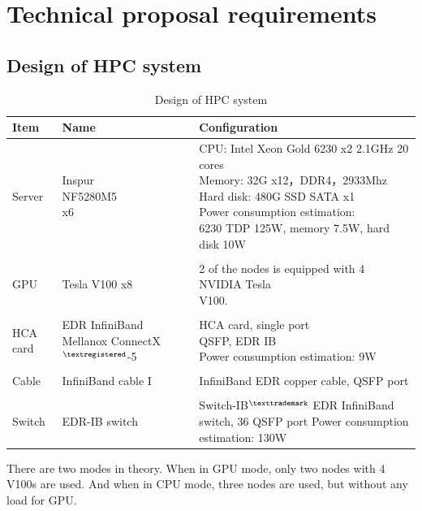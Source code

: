 \documentclass[a4paper, 11pt]{article}
\begin{document}
		
	\section{Technical proposal requirements}

		\subsection{Design of HPC system}
			\begin{table}[H]
				\begin{center}
					\caption{Design of HPC system}
					\label{tab1}  
					\begin{tabular}{l l l}
						\toprule
						Item & Name & Configuration\\			
						\midrule
						Server & \makecell[l]{Inspur \\NF5280M5 \\x6} & \makecell[l]{CPU: Intel Xeon Gold 6230 x2 2.1GHz 20 cores \\ Memory: 32G x12，DDR4，2933Mhz \\ Hard disk: 480G SSD SATA x1 \\ Power consumption estimation:\\ 6230 TDP 125W, memory 7.5W, hard disk 10W}\\
						&&\\
						GPU & Tesla V100 x8 & \makecell[l]{2 of the nodes is equipped with 4 NVIDIA Tesla \\V100.}\\
						&&\\
						HCA card & \makecell[l]{EDR\\
							InfiniBand Mellanox \\ConnectX$^{\tiny{\textregistered}}$-5} & \makecell[l]{HCA card, single port\\
							QSFP, EDR IB\\
							Power consumption estimation: 9W
						}\\
						&&\\
						Cable & InfiniBand cable I & InfiniBand EDR copper cable, QSFP port\\
						&&\\
						Switch & EDR-IB switch & \makecell[l]{Switch-IB$^{\tiny{\texttrademark}}$ EDR InfiniBand switch, \\36 QSFP port\\
							Power consumption estimation: 130W
						}\\
						\bottomrule
					\end{tabular}
				\end{center}
			\end{table}
			There are two modes in theory. When in GPU mode, only two nodes with 4 V100s are used. And when in CPU mode, three nodes are used, but without any load for GPU. 
			
\end{document}
